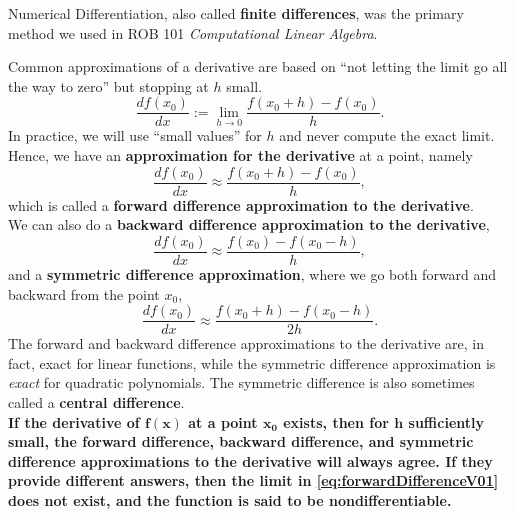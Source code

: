 Numerical Differentiation, also called \textbf{finite differences}, was the primary method we used in ROB 101 \textit{Computational Linear Algebra}. 

\begin{tcolorbox}[title=\textbf{Numerical Approximations of a Derivative}, breakable]

Common approximations of a derivative are based on ``not letting the limit go all the way to zero'' but stopping at $h$ small.
 \begin{equation}
\label{eq:forwardDifferenceV01}
    \frac{ df(x_0) }{d x}:= \lim_{h \to 0} \frac{f(x_0 + h) - f(x_0)}{h}.
\end{equation}
In practice, we will use ``small values'' for $h$ and never compute the exact limit. Hence, we have an \textbf{approximation for the derivative} at a point, namely
\begin{equation}
\label{eq:forwardDifference}
    \frac{df(x_0)}{dx}\approx \frac{f(x_0 + h) - f(x_0)}{h},
\end{equation}
which is called a \textbf{forward difference approximation to the derivative}.\\

We can also do a \textbf{backward difference approximation to the derivative},
\begin{equation}
\label{eq:backwardDifference}
   \frac{df(x_0)}{dx}\approx \frac{f(x_0) - f(x_0-  h)}{h},
\end{equation}
and a \textbf{symmetric difference approximation}, where we go both forward and backward from the point $x_0$,
\begin{equation}
\label{eq:symmetricDifference}
   \frac{df(x_0)}{dx}\approx \frac{f(x_0 + h)- f(x_0-  h)}{2 h}.
\end{equation}
The forward and backward difference approximations to the derivative are, in fact, exact for linear functions, while the symmetric difference approximation is \textit{exact} for quadratic polynomials. The symmetric difference is also sometimes called a \textbf{central difference}.\\

\textbf{If the derivative of $\mathbf{f(x)}$ at a point $\mathbf{x_0}$ exists, then for $\mathbf{h}$ sufficiently small, the forward difference, backward difference, and symmetric difference approximations to the derivative will always agree. If they provide different answers, then the limit in \eqref{eq:forwardDifferenceV01} does not exist, and the function is said to be nondifferentiable.}

\end{tcolorbox}


